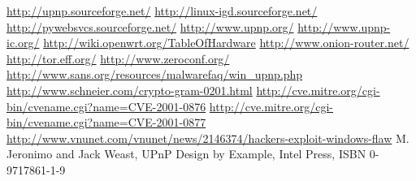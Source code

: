 \documentclass[10pt]{article}
\begin{document}
\begin{thebibliography}{xx}
 \url{http://upnp.sourceforge.net/}
 \url{http://linux-igd.sourceforge.net/}
 \url{http://pywebsvcs.sourceforge.net/}
 \url{http://www.upnp.org/}
 \url{http://www.upnp-ic.org/}
 \url{http://wiki.openwrt.org/TableOfHardware}
 \url{http://www.onion-router.net/}
 \url{http://tor.eff.org/}
 \url{http://www.zeroconf.org/}
 \url{http://www.sans.org/resources/malwarefaq/win_upnp.php}
 \url{http://www.schneier.com/crypto-gram-0201.html}
 \url{http://cve.mitre.org/cgi-bin/cvename.cgi?name=CVE-2001-0876}
 \url{http://cve.mitre.org/cgi-bin/cvename.cgi?name=CVE-2001-0877}
 \url{http://www.vnunet.com/vnunet/news/2146374/hackers-exploit-windows-flaw}
 M. Jeronimo and Jack Weast, UPnP Design by Example, Intel Press, ISBN 0-9717861-1-9
\end{thebibliography}

\end{document}
